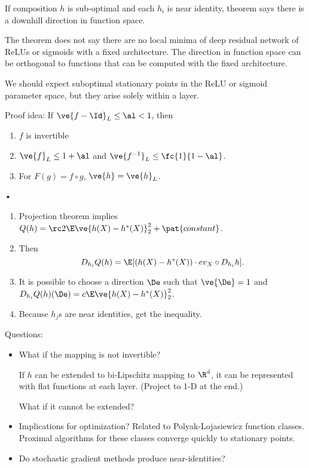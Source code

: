 If composition $h$ is sub-optimal and each $h_i$ is near identity, theorem says there is a downhill direction in function space.

The theorem does not say there are no local minima of deep residual network of ReLUs or sigmoids with a fixed architecture. The direction in function space can be orthogonal to functions that can be computed with the fixed architecture.

We should expect suboptimal stationary points in the ReLU or sigmoid parameter space, but they arise solely within a layer.

Proof idea: If $\ve{f-\Id}_L\le \al<1$, then
\begin{enumerate}
\item
$f$ is invertible
\item
$\ve{f}_L\le 1+\al$ and $\ve{f^{-1}}_L \le \fc{1}{1-\al}$.
\item
For $F(g)=f\circ g$, $\ve{h}=\ve{h}_L$. 
\end{enumerate}•
\begin{enumerate}
\item
Projection theorem implies $Q(h) = \rc 2 \E\ve{h(X) - h^*(X)}_2^2+\pat{constant}$.
\item
Then $$D_{h_i} Q(h) = \E[(h(X)-h^*(X))\cdot ev_X \circ D_{h_i}h].$$
\item
It is possible to choose a direction $\De$ such that $\ve{\De}=1$ and $D_{h_i}Q(h) (\De) = c\E\ve{h(X)-h^*(X)}_2^2$. 
\item
Because $h_j$s are near identities, get the inequality.
\end{enumerate}

Questions:
\begin{itemize}
\item
What if the mapping is not invertible?

If $h$ can be extended to bi-Lipschitz mapping to $\R^d$, it can be represented with flat functions at each layer. (Project to 1-D at the end.)

What if it cannot be extended?
\item
Implications for optimization? Related to Polyak-Lojasiewicz function classes. Proximal algorithms for these classes converge quickly to stationary points.
\item
Do stochastic gradient methods produce near-identities?
\end{itemize}




